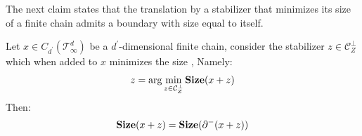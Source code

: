 The next claim states that the translation by a stabilizer that minimizes its size of a finite chain admits a boundary with size equal to itself.
\begin{claim}
  \label{claim:reducederr}
  Let $x \in C_{d^{\prime}}(\mathcal T_\infty^d)$ be a $d^{\prime}$-dimensional finite chain, consider the stabilizer  $z \in \mathcal{C}_{Z}^{\perp}$ which when added to $x$ minimizes the size , Namely: 
  \begin{equation*}
    \begin{split}
      z =  \arg \min_{z \in \mathcal{C}_{Z}^{\perp}} \mathbf{Size}( x + z )  
    \end{split}
  \end{equation*}
  Then: 
  \begin{equation*}
    \begin{split}
      \mathbf{Size}( x + z ) = \mathbf{Size}( \partial^{-}( x + z) ) 
    \end{split}
  \end{equation*}
\end{claim}
